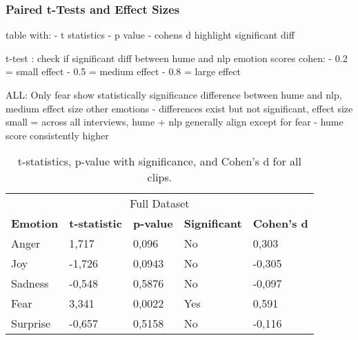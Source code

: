 \subsubsection{Paired t-Tests and Effect Sizes}
table with: 
- t statistics 
- p value 
- cohens d 
highlight significant diff 

t-test : check if significant diff between hume and nlp emotion scores 
cohen: - 0.2 = small effect
- 0.5 = medium effect
- 0.8 = large effect

ALL: 
Only fear show statistically significance difference between hume and nlp, medium effect size 
other emotions - differences exist but not significant, effect size small 
= across all interviews, hume + nlp generally align except for fear - hume score consistently higher 



\begin{table}[!h]
    \centering
    \begin{tabular}{lllll}
    \multicolumn{5}{c}{\cellcolor[HTML]{C0C0C0}Full Dataset}                                                                                                                                                    \\
    \multicolumn{1}{c|}{\textbf{Emotion}} & \multicolumn{1}{c}{\textbf{t-statistic}} & \multicolumn{1}{c}{\textbf{p-value}} & \multicolumn{1}{c}{\textbf{Significant}} & \multicolumn{1}{c}{\textbf{Cohen's d}} \\ \hline
    \multicolumn{1}{l|}{Anger}            & 1,717                                    & 0,096                                & No                                       & 0,303                                  \\
    \multicolumn{1}{l|}{Joy}              & -1,726                                   & 0,0943                               & No                                       & -0,305                                 \\
    \multicolumn{1}{l|}{Sadness}          & -0,548                                   & 0,5876                               & No                                       & -0,097                                 \\
    \multicolumn{1}{l|}{Fear}             & 3,341                                    & 0,0022                               & Yes                                      & 0,591                                  \\
    \multicolumn{1}{l|}{Surprise}         & -0,657                                   & 0,5158                               & No                                       & -0,116                                
    \end{tabular}
    \caption{t-statistics, p-value with significance, and Cohen's d for all clips.}
    \label{tab:t-test-all}
\end{table}


